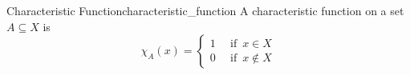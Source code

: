 \begin{definition}{Characteristic Function}{characteristic_function}
A characteristic function on a set \( A \subseteq X \) is 
\[
\chi _{ A } \left( x \right) = 
\begin{cases}
    1 & \enspace \text{if} \enspace  x \in  X\\
    0 & \enspace \text{if} \enspace  x \not\in  X
\end{cases}
\]
\end{definition}
